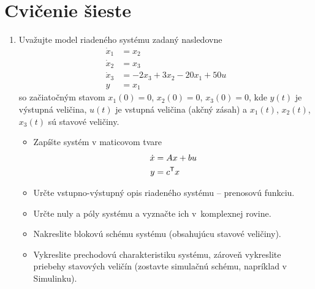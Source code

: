 \documentclass[a4paper, 10pt, ]{article}
\begin{document}
\section{Cvičenie šieste}



\begin{enumerate}[leftmargin=0pt, labelsep=4mm, itemsep=0pt]

    \item Uvažujte model riadeného systému zadaný nasledovne
    \begin{subequations} \label{system3radu}
    \begin{align}
        \dot{x}_1 &= x_2   \\
        \dot{x}_2 &= x_3   \\
        \dot{x}_3 &= -2 x_3 + 3 x_2 - 20 x_1 + 50 u  \\
        y &= x_1
    \end{align}
    \end{subequations}
    so začiatočným stavom $x_1(0)=0$, $x_2(0)=0$, $x_3(0)=0$, kde $y(t)$ je výstupná veličina, $u(t)$ je vstupná veličina (akčný zásah) a $x_1(t)$, $x_2(t)$, $x_3(t)$ sú stavové veličiny.

    \begin{itemize}[leftmargin=0pt, labelsep=4mm, itemsep=0pt]

        \item Zapíšte systém v maticovom tvare
        \begin{subequations}
            \begin{align}
                 \dot x &= A x + b u \\
                 y &= c^{\mathsf{T}} x
            \end{align}
        \end{subequations}

        \item Určte vstupno-výstupný opis riadeného systému -- prenosovú funkciu. 
        \item Určte nuly a póly systému a vyznačte ich v~komplexnej rovine. 
        \item Nakreslite blokovú schému systému (obsahujúcu stavové veličiny). 
        \item Vykreslite prechodovú charakteristiku systému, zároveň vykreslite priebehy stavových veličín (zostavte simulačnú schému, napríklad v Simulinku). 

    \end{itemize}






\end{enumerate}
\end{document}
